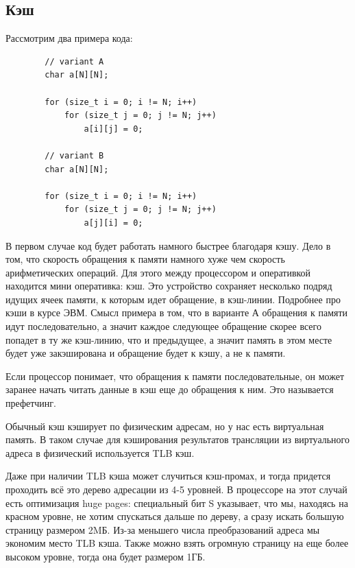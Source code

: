 \documentclass[12pt, a4paper]{article}
\begin{document}
	\subsection{Кэш}
	Рассмотрим два примера кода:
	\begin{verbatim}
		// variant A
		char a[N][N];
		
		for (size_t i = 0; i != N; i++)
		    for (size_t j = 0; j != N; j++)
		        a[i][j] = 0;
		
		// variant B
		char a[N][N];
		
		for (size_t i = 0; i != N; i++)
		    for (size_t j = 0; j != N; j++)
		        a[j][i] = 0;
	\end{verbatim}
	В первом случае код будет работать намного быстрее благодаря кэшу. Дело в том, что скорость обращения к памяти намного хуже чем скорость арифметических операций. Для этого между процессором и оперативкой находится мини оперативка: кэш. Это устройство сохраняет несколько подряд идущих ячеек памяти, к которым идет обращение, в кэш-линии. Подробнее про кэши в курсе ЭВМ. Смысл примера в том, что в варианте А обращения к памяти идут последовательно, а значит каждое следующее обращение скорее всего попадет в ту же кэш-линию, что и предыдущее, а значит память в этом месте будет уже закэширована и обращение будет к кэшу, а не к памяти.
	\par Если процессор понимает, что обращения к памяти последовательные, он может заранее начать читать данные в кэш еще до обращения к ним. Это называется префетчинг.
	\\\par Обычный кэш кэширует по физическим адресам, но у нас есть виртуальная память. В таком случае для кэширования результатов трансляции из виртуального адреса в физический используется TLB кэш.
	\par Даже при наличии TLB кэша может случиться кэш-промах, и тогда придется проходить всё это дерево адресации из 4-5 уровней. В процессоре на этот случай есть оптимизация huge pages: специальный бит S указывает, что мы, находясь на красном уровне, не хотим спускаться дальше по дереву, а сразу искать большую страницу размером 2MБ. Из-за меньшего числа преобразований адреса мы экономим место TLB кэша. Также можно взять огромную страницу на еще более высоком уровне, тогда она будет размером 1ГБ.
\end{document}

